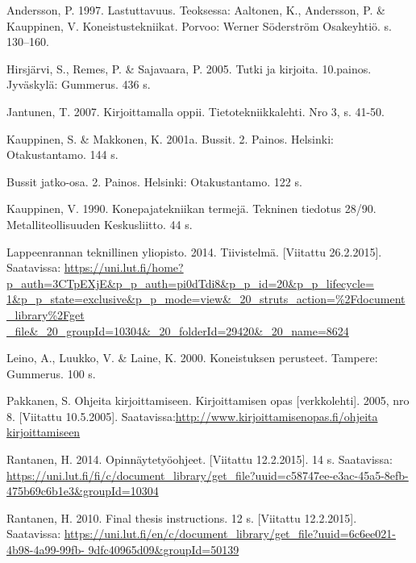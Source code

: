 \documentclass{LUT_pohja}[2016/03/09 LUT Dippa Pohja]
\begin{document}
\newpage
\renewcommand\refname{LÄHTEET} %
\begin{thebibliography}{99}
 Andersson, P. 1997. Lastuttavuus. Teoksessa: Aaltonen, K., Andersson, P. \& Kauppinen, V. Koneistustekniikat. Porvoo: Werner Söderström Osakeyhtiö. s. 130–160.

Hirsjärvi, S., Remes, P. \& Sajavaara, P. 2005. Tutki ja kirjoita. 10.painos. Jyväskylä: Gummerus. 436 s.

Jantunen, T. 2007. Kirjoittamalla oppii. Tietotekniikkalehti. Nro 3, s. 41-50.

Kauppinen, S. \& Makkonen, K. 2001a. Bussit. 2. Painos. Helsinki: Otakustantamo. 144 s.

Bussit jatko-osa. 2. Painos. Helsinki: Otakustantamo. 122 s. 

Kauppinen,  V.  1990.  Konepajatekniikan  termejä.  Tekninen  tiedotus  28/90. Metalliteollisuuden Keskusliitto. 44 s.

Lappeenrannan teknillinen yliopisto. 2014. Tiivistelmä. [Viitattu 26.2.2015]. Saatavissa:
\url{https://uni.lut.fi/home?p_auth=3CTpEXjE&p_p_auth=pi0dTdi8&p_p_id=20&p_p_lifecycle=
1&p_p_state=exclusive&p_p_mode=view&_20_struts_action=%
_file&_20_groupId=10304&_20_folderId=29420&_20_name=8624 }

Leino, A., Luukko, V. \& Laine, K. 2000. Koneistuksen perusteet. Tampere: Gummerus. 100 s.

Pakkanen, S. Ohjeita kirjoittamiseen. Kirjoittamisen opas [verkkolehti]. 2005, nro 8. [Viitattu 10.5.2005]. Saatavissa:\url{http://www.kirjoittamisenopas.fi/ohjeita kirjoittamiseen}

Rantanen, H. 2014. Opinnäytetyöohjeet.  [Viitattu  12.2.2015].  14  s.  Saatavissa: \url{https://uni.lut.fi/fi/c/document_library/get_file?uuid=c58747ee-e3ac-45a5-8efb-
475b69c6b1e3&groupId=10304}

Rantanen, H. 2010. Final thesis instructions. 12 s. [Viitattu 12.2.2015]. Saatavissa: 
\url{https://uni.lut.fi/en/c/document_library/get_file?uuid=6c6ee021-4b98-4a99-99fb-
9dfc40965d09&groupId=50139}



\end{thebibliography}
\end{document}

